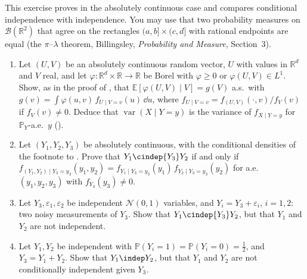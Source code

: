 \begin{exercise}\label{ex:cp-conditional-independence}
\hard This exercise proves  in the absolutely
continuous case and compares conditional independence with independence. You may use that two
probability measures on $\mathcal B(\mathbb R^2)$ that agree on the rectangles $(a,b]\times(c,d]$
with rational endpoints are equal (the $\pi$--$\lambda$ theorem, Billingsley, \emph{Probability and Measure}, Section~3).
\begin{enumerate}[label=(\alph*)]
  \item Let $(U,V)$ be an absolutely continuous random vector, $U$ with values in $\mathbb R^d$ and
    $V$ real, and let $\varphi:\mathbb R^d\times\mathbb R\to\mathbb R$ be Borel with $\varphi\ge0$ or
    $\varphi(U,V)\in L^1$. Show, as in the proof of , that
    $\mathbb E[\varphi(U,V)\mid V]=g(V)$ a.s.\ with $g(v)=\int\varphi(u,v)\,f_{U\mid V=v}(u)\,\dd u$,
    where $f_{U\mid V=v}=f_{(U,V)}(\cdot,v)/f_V(v)$ if $f_V(v)\ne0$. Deduce that
    $\operatorname{var}(X\mid Y=y)$ is the variance of $f_{X\mid Y=y}$ for $\mathbb P_Y$-a.e.\ $y$
    ().
  \item Let $(Y_1,Y_2,Y_3)$ be absolutely continuous, with the conditional densities of the footnote
    to . Prove that $Y_1\cindep{Y_3}Y_2$ if and
    only if $f_{(Y_1,Y_2)\mid Y_3=y_3}(y_1,y_2)=f_{Y_1\mid Y_3=y_3}(y_1)\,f_{Y_2\mid Y_3=y_3}(y_2)$ for
    a.e.\ $(y_1,y_2,y_3)$ with $f_{Y_3}(y_3)\ne0$.
  \item Let $Y_3,\varepsilon_1,\varepsilon_2$ be independent $\mathcal N(0,1)$ variables, and
    $Y_i=Y_3+\varepsilon_i$, $i=1,2$: two noisy measurements of $Y_3$. Show that $Y_1\cindep{Y_3}Y_2$,
    but that $Y_1$ and $Y_2$ are not independent.
  \item Let $Y_1,Y_2$ be independent with $\mathbb P(Y_i=1)=\mathbb P(Y_i=0)=\frac12$, and
    $Y_3=Y_1+Y_2$. Show that $Y_1\indep Y_2$, but that $Y_1$ and $Y_2$ are not conditionally
    independent given $Y_3$.
\end{enumerate}
\end{exercise}
